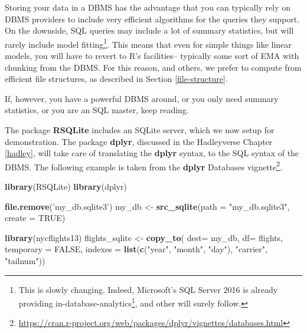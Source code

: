 \documentclass[]{book}
\newenvironment{Shaded}{\begin{snugshade}}{\end{snugshade}}
\newcommand{\DataTypeTok}[1]{\textcolor[rgb]{0.13,0.29,0.53}{#1}}
\newcommand{\KeywordTok}[1]{\textcolor[rgb]{0.13,0.29,0.53}{\textbf{#1}}}
\newcommand{\NormalTok}[1]{#1}
\newcommand{\OtherTok}[1]{\textcolor[rgb]{0.56,0.35,0.01}{#1}}
\newcommand{\StringTok}[1]{\textcolor[rgb]{0.31,0.60,0.02}{#1}}
\renewcommand{\href}[2]{#2\footnote{\url{#1}}}
\theoremstyle{definition}
\theoremstyle{definition}
\theoremstyle{definition}
\theoremstyle{remark}
\begin{document}
Storing your data in a DBMS has the advantage that you can typically rely on DBMS providers to include very efficient algorithms for the queries they support.
On the downside, SQL queries may include a lot of summary statistics, but will rarely include model fitting\footnote{This is slowly changing. Indeed, Microsoft's SQL Server 2016 is already providing \href{https://blogs.technet.microsoft.com/dataplatforminsider/2016/03/29/in-database-advanced-analytics-with-r-in-sql-server-2016/}{in-database-analytics}, and other will surely follow.}.
This means that even for simple things like linear models, you will have to revert to R's facilities-- typically some sort of EMA with chunking from the DBMS.
For this reason, and others, we prefer to compute from efficient file structures, as described in Section \ref{file-structure}.

If, however, you have a powerful DBMS around, or you only need summary statistics, or you are an SQL master, keep reading.

The package \textbf{RSQLite} includes an SQLite server, which we now setup for demonstration.
The package \textbf{dplyr}, discussed in the Hadleyverse Chapter \ref{hadley}, will take care of translating the \textbf{dplyr} syntax, to the SQL syntax of the DBMS.
The following example is taken from the \textbf{dplyr} \href{https://cran.r-project.org/web/packages/dplyr/vignettes/databases.html}{Databases vignette}.

\begin{Shaded}
\begin{Highlighting}[]
\KeywordTok{library}\NormalTok{(RSQLite)}
\KeywordTok{library}\NormalTok{(dplyr)}

\KeywordTok{file.remove}\NormalTok{(}\StringTok{'my_db.sqlite3'}\NormalTok{)}
\NormalTok{my_db <-}\StringTok{ }\KeywordTok{src_sqlite}\NormalTok{(}\DataTypeTok{path =} \StringTok{"my_db.sqlite3"}\NormalTok{, }\DataTypeTok{create =} \OtherTok{TRUE}\NormalTok{)}

\KeywordTok{library}\NormalTok{(nycflights13)}
\NormalTok{flights_sqlite <-}\StringTok{ }\KeywordTok{copy_to}\NormalTok{(}
  \DataTypeTok{dest=}\NormalTok{ my_db, }
  \DataTypeTok{df=}\NormalTok{ flights, }
  \DataTypeTok{temporary =} \OtherTok{FALSE}\NormalTok{, }
  \DataTypeTok{indexes =} \KeywordTok{list}\NormalTok{(}\KeywordTok{c}\NormalTok{(}\StringTok{"year"}\NormalTok{, }\StringTok{"month"}\NormalTok{, }\StringTok{"day"}\NormalTok{), }\StringTok{"carrier"}\NormalTok{, }\StringTok{"tailnum"}\NormalTok{))}
\end{Highlighting}
\end{Shaded}
\end{document}
